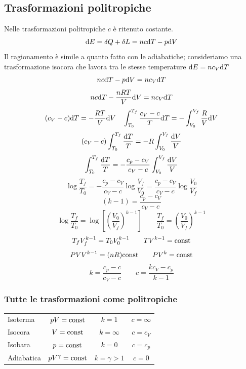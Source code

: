 \subsection{Trasformazioni politropiche}
Nelle trasformazioni politropiche $c$ è ritenuto costante.
\[\mathrm{d} E=\delta Q+\delta L=nc\mathrm{d} T-p\mathrm{d} V\]
Il ragionamento è simile a quanto fatto con le adiabatiche; consideriamo una trasformazione isocora che lavora tra le stesse temperature $\mathrm{d} E=nc_V\mathrm{d} T$
\[nc\mathrm{d} T-p\mathrm{d} V=nc_V\mathrm{d} T\]
\[nc\mathrm{d} T-\frac{nRT}{V}\mathrm{d} V=nc_V\mathrm{d} T\]
\[(c_V-c)\mathrm{d} T=-\frac{RT}{V}\mathrm{d} V\quad \int_{T_0}^{T_f}\frac{c_V-c}{T}\mathrm{d} T=-\int_{V_0}^{V_f}\frac{R}{V}\mathrm{d} V\]
\[(c_V-c)\int_{T_0}^{T_f}\frac{\mathrm{d} T}{T}=-R\int_{V_0}^{V_f}\frac{\mathrm{d} V}{V}\]
\[\int_{T_0}^{T_f}\frac{\mathrm{d} T}{T}=-\frac{c_p-c_V}{c_V-c}\int_{V_0}^{V_f}\frac{\mathrm{d} V}{V}\]
\[\log\frac{T_f}{T_0}=-\frac{c_p-c_V}{c_V-c}\log\frac{V_f}{V_0}=\frac{c_p-c_V}{c_V-c}\log\frac{V_0}{V_f}\]
\[(k-1)=\frac{c_p-c_V}{c_V-c}\]
\[\log\frac{T_f}{T_0}=\log\left[\left(\frac{V_0}{V_f}\right)^{k-1}\right]\qquad\frac{T_f}{T_0}=\left(\frac{V_0}{V_f}\right)^{k-1}\]
\[T_fV_f^{k-1}=T_0V_0^{k-1}\qquad TV^{k-1}=\text{const}\]
\[PVV^{k-1}=(nR)\text{const}\qquad PV^k=\text{const}\]
\[k=\frac{c_p-c}{c_V-c}\qquad c=\frac{kc_V-c_p}{k-1}\]
\subsubsection{Tutte le trasformazioni come politropiche}
\begin{center}
   \begin{tabular}{l|ccc}
      Isoterma   & $pV=\text{const}$        & $k=1$        & $c=\infty$ \\
      Isocora    & $V=\text{const}$         & $k=\infty$   & $c=c_V$    \\
      Isobara    & $p=\text{const}$         & $k=0$        & $c=c_p$    \\
      Adiabatica & $pV^\gamma=\text{const}$ & $k=\gamma>1$ & $c=0$      \\
   \end{tabular}
\end{center}

